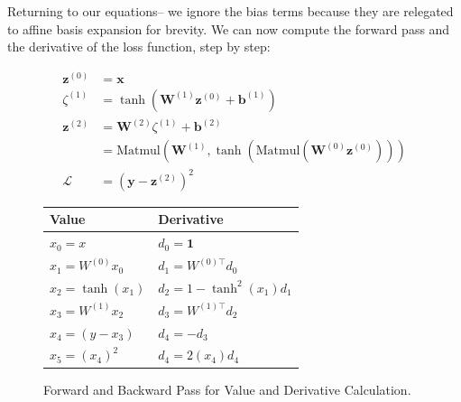 Returning to our equations– we ignore the bias terms because they are relegated to affine basis expansion for brevity. We can now compute the forward pass and the derivative of the loss function, step by step:

\begin{align*}
    \bm{z}^{(0)} & = \bm{x}                                                                                                               \\
    \zeta^{(1)}  & = \tanh\left( \bm{W}^{(1)} \bm{z}^{(0)} + \bm{b}^{(1)} \right)                                                         \\
    \bm{z}^{(2)} & = \bm{W}^{(2)} \zeta^{(1)} + \bm{b}^{(2)}                                                                              \\
                 & = \text{Matmul}\left( \bm{W}^{(1)}, \tanh\left( \text{Matmul} \left( \bm{W}^{(0)} \bm{z}^{(0)} \right) \right) \right) \\
    \mathcal{L}  & = \left( \bm{y} - \bm{z}^{(2)} \right)^2
\end{align*}

\begin{figure}[h!]
    \centering
    \begin{tabularx}{\linewidth}{X X}
        \toprule
        \textbf{Value}      & \textbf{Derivative}          \\
        \midrule
        $x_0 = x$           & $d_0 = \bm{1}$               \\
        $x_1 = W^{(0)} x_0$ & $d_1 = W^{(0)\top} d_0$      \\
        $x_2 = \tanh(x_1)$  & $d_2 = 1 - \tanh^2(x_1) d_1$ \\
        $x_3 = W^{(1)} x_2$ & $d_3 = W^{(1)\top} d_2$      \\
        $x_4 = (y - x_3)$   & $d_4 = -d_3$                 \\
        $x_5 = (x_4)^2$     & $d_4 = 2(x_4) d_4$           \\
        \bottomrule
    \end{tabularx}
    \caption{Forward and Backward Pass for Value and Derivative Calculation. }
\end{figure}

